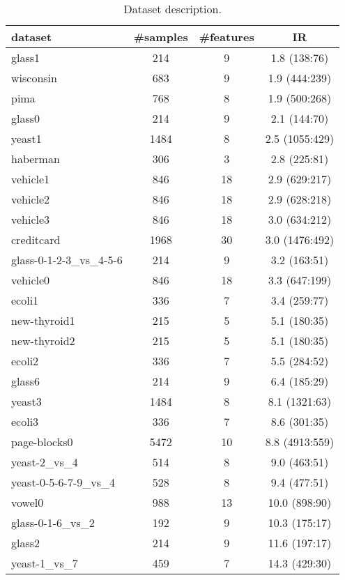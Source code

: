 \begin{table}[htbp]
	\centering
	\caption{Dataset description.}
	
	\begin{tabular}{lccc}
		\hline
		dataset & \#samples & \#features & IR \\
		\hline
		glass1 & 214   & 9     & 1.8 (138:76)\\
		wisconsin & 683   & 9     & 1.9 (444:239) \\
		pima  & 768   & 8     & 1.9 (500:268)\\
		glass0 & 214   & 9     & 2.1 (144:70) \\
		yeast1 & 1484  & 8     & 2.5 (1055:429)\\
		haberman & 306   & 3     & 2.8 (225:81) \\
		vehicle1 & 846   & 18    & 2.9 (629:217)\\
		vehicle2 & 846   & 18    & 2.9 (628:218)\\
		vehicle3 & 846   & 18    & 3.0 (634:212)\\
		creditcard & 1968  & 30    & 3.0 (1476:492)\\
		glass-0-1-2-3\_vs\_4-5-6 & 214   & 9     & 3.2 (163:51)\\
		vehicle0 & 846   & 18    & 3.3 (647:199)\\
		ecoli1 & 336   & 7     & 3.4 (259:77)\\
		new-thyroid1 & 215   & 5     & 5.1 (180:35) \\
		new-thyroid2 & 215   & 5     & 5.1 (180:35)\\
		ecoli2 & 336   & 7     & 5.5 (284:52)\\
		glass6 & 214   & 9     & 6.4 (185:29)\\
		yeast3 & 1484  & 8     & 8.1 (1321:63)\\
		ecoli3 & 336   & 7     & 8.6 (301:35)\\
		page-blocks0 & 5472  & 10    & 8.8 (4913:559)\\
		yeast-2\_vs\_4 & 514   & 8     & 9.0 (463:51)\\
		yeast-0-5-6-7-9\_vs\_4 & 528   & 8     & 9.4 (477:51)\\
		vowel0 & 988   & 13    & 10.0 (898:90)\\
		glass-0-1-6\_vs\_2 & 192   & 9     & 10.3 (175:17)\\
		glass2 & 214   & 9     & 11.6 (197:17)\\
		yeast-1\_vs\_7 & 459   & 7     & 14.3 (429:30)\\

\end{tabular}
\end{table}
